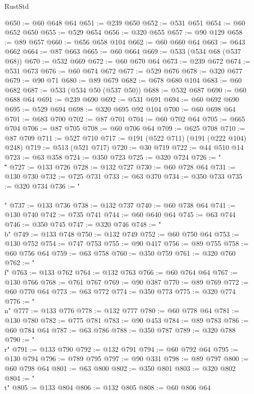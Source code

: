 \begin{lexlean}{RustStd}
\begin{coremodule}
{\begin{coremodule}
{{{{{{{{{{{{{{{{{{{{{{{{{{{{{{{{@650 := @60 @648 @64
@651 := @239 @650
@652 := @531 @651
@654 := @60 @652 @650
@655 := @529 @654
@656 := @320 @655
@657 := @90 @129
@658 := @89 @657
@660 := @656 @658 @104
@662 := @60 @660 @64
@663 := @643 @662
@664 := @87 @663
@665 := @60 @664
@669 := @533 (@534 @68 (@537 @68))
@670 := @532 @669
@672 := @60 @670 @64
@673 := @239 @672
@674 := @531 @673
@676 := @60 @674 @672
@677 := @529 @676
@678 := @320 @677
@679 := @90 @71
@680 := @89 @679
@682 := @678 @680 @104
@683 := @60 @682
@687 := @533 (@534 @50 (@537 @50))
@688 := @532 @687
@690 := @60 @688 @64
@691 := @239 @690
@692 := @531 @691
@694 := @60 @692 @690
@695 := @529 @694
@698 := @320 @695 @92 @104
@700 := @60 @698 @64
@701 := @683 @700
@702 := @87 @701
@704 := @60 @702 @64
@705 := @665 @704
@706 := @87 @705
@708 := @60 @706 @64
@709 := @625 @708
@710 := @87 @709
@711 := @527 @710
@717 := @191 (@522 @711) (@191 (@222 @104) @248)
@719 := @513 (@521 @717)
@720 := @30 @719
@722 := @44 @510 @14
@723 := @63 @358
@724 := @350 @723
@725 := @320 @724
@726 := "\\\""
@727 := @133 @726
@728 := @132 @727
@730 := @60 @728 @64
@731 := @130 @730
@732 := @725 @731
@733 := @63 @370
@734 := @350 @733
@735 := @320 @734
@736 := "\\\\"
@737 := @133 @736
@738 := @132 @737
@740 := @60 @738 @64
@741 := @130 @740
@742 := @735 @741
@744 := @60 @640 @64
@745 := @63 @744
@746 := @350 @745
@747 := @320 @746
@748 := "\\b"
@749 := @133 @748
@750 := @132 @749
@752 := @60 @750 @64
@753 := @130 @752
@754 := @747 @753
@755 := @90 @417
@756 := @89 @755
@758 := @60 @756 @64
@759 := @63 @758
@760 := @350 @759
@761 := @320 @760
@762 := "\\f"
@763 := @133 @762
@764 := @132 @763
@766 := @60 @764 @64
@767 := @130 @766
@768 := @761 @767
@769 := @90 @387
@770 := @89 @769
@772 := @60 @770 @64
@773 := @63 @772
@774 := @350 @773
@775 := @320 @774
@776 := "\\n"
@777 := @133 @776
@778 := @132 @777
@780 := @60 @778 @64
@781 := @130 @780
@782 := @775 @781
@783 := @90 @453
@784 := @89 @783
@786 := @60 @784 @64
@787 := @63 @786
@788 := @350 @787
@789 := @320 @788
@790 := "\\r"
@791 := @133 @790
@792 := @132 @791
@794 := @60 @792 @64
@795 := @130 @794
@796 := @789 @795
@797 := @90 @331
@798 := @89 @797
@800 := @60 @798 @64
@801 := @63 @800
@802 := @350 @801
@803 := @320 @802
@804 := "\\t"
@805 := @133 @804
@806 := @132 @805
@808 := @60 @806 @64
}}}}}}}}}}}}}}}}}}}}}}}}}}}}}}}}
\end{coremodule}}
\end{coremodule}
\end{lexlean}
